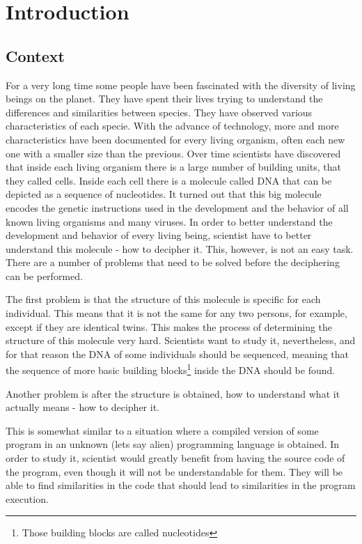 \documentclass[11pt]{article}
\begin{document}
\section{Introduction}
\label{sec:Introduction}

\subsection{Context}
\label{sub:Contex}
For a very long time some people have been fascinated with the diversity of
living beings on the planet. They have spent their lives trying to understand
the differences and similarities between species. They have observed various
characteristics of each specie. With the advance of technology, more and more
characteristics have been documented for every living organism, often each new
one with a smaller size than the previous. Over time scientists have discovered
that inside each living organism there is a large number of building units, that
they called cells. Inside each cell there is a molecule called DNA that can be
depicted as a sequence of nucleotides. It turned out that this big molecule
encodes the genetic instructions used in the development and the behavior of all
known living organisms and many viruses. In order to better understand the
development and behavior of every living being, scientist have to better
understand this molecule - how to decipher it. This, however, is not an
easy task. There are a number of problems that need to be solved before the
deciphering can be performed.

The first problem is that the structure of this molecule is specific for each
individual. This means that it is not the same for any
two persons, for example, except if they are identical twins. This makes the
process of determining the structure of this molecule very hard. Scientists want
to study it, nevertheless, and for that reason the DNA of some individuals
should be sequenced, meaning that the sequence of more basic building
blocks\footnote{Those building blocks are called nucleotides} inside the DNA
should be found.

Another problem is after the structure is obtained, how to understand what it
actually means - how to decipher it.

This is somewhat similar to a situation where a compiled version of some program
in an unknown (lets say alien) programming language is obtained. In order to
study it, scientist would greatly benefit from having the source code of the
program, even though it will not be understandable for them. They will be able
to find similarities in the code that should lead to similarities in the program
execution.
\end{document}
